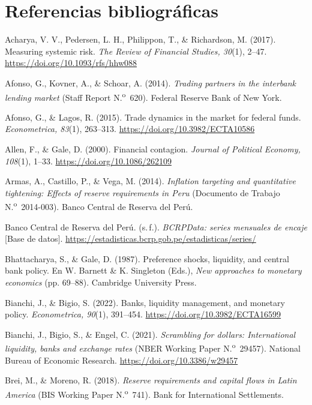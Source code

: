 \documentclass[11pt,a4paper]{article}
\newenvironment{refs}
{\begin{list}{}{\setlength{\leftmargin}{2em}\setlength{\itemindent}{-2em}\setlength{\itemsep}{6pt}\setlength{\parsep}{0pt}}\RaggedRight}
{\end{list}}
\begin{document}
\clearpage
\section{Referencias bibliográficas}\label{sec:refs}
\begin{refs}
\item Acharya, V. V., Pedersen, L. H., Philippon, T., \& Richardson, M. (2017). Measuring systemic risk. \textit{The Review of Financial Studies, 30}(1), 2--47. \url{https://doi.org/10.1093/rfs/hhw088}
\item Afonso, G., Kovner, A., \& Schoar, A. (2014). \textit{Trading partners in the interbank lending market} (Staff Report N.\textsuperscript{o}~620). Federal Reserve Bank of New York.
\item Afonso, G., \& Lagos, R. (2015). Trade dynamics in the market for federal funds. \textit{Econometrica, 83}(1), 263--313. \url{https://doi.org/10.3982/ECTA10586}
\item Allen, F., \& Gale, D. (2000). Financial contagion. \textit{Journal of Political Economy, 108}(1), 1--33. \url{https://doi.org/10.1086/262109}
\item Armas, A., Castillo, P., \& Vega, M. (2014). \textit{Inflation targeting and quantitative tightening: Effects of reserve requirements in Peru} (Documento de Trabajo N.\textsuperscript{o}~2014-003). Banco Central de Reserva del Perú.
\item Banco Central de Reserva del Perú. (s.\,f.). \textit{BCRPData: series mensuales de encaje} [Base de datos]. \url{https://estadisticas.bcrp.gob.pe/estadisticas/series/}
\item Bhattacharya, S., \& Gale, D. (1987). Preference shocks, liquidity, and central bank policy. En W. Barnett \& K. Singleton (Eds.), \textit{New approaches to monetary economics} (pp. 69--88). Cambridge University Press.
\item Bianchi, J., \& Bigio, S. (2022). Banks, liquidity management, and monetary policy. \textit{Econometrica, 90}(1), 391--454. \url{https://doi.org/10.3982/ECTA16599}
\item Bianchi, J., Bigio, S., \& Engel, C. (2021). \textit{Scrambling for dollars: International liquidity, banks and exchange rates} (NBER Working Paper N.\textsuperscript{o}~29457). National Bureau of Economic Research. \url{https://doi.org/10.3386/w29457}
\item Brei, M., \& Moreno, R. (2018). \textit{Reserve requirements and capital flows in Latin America} (BIS Working Paper N.\textsuperscript{o}~741). Bank for International Settlements.

\end{refs}
\end{document}
